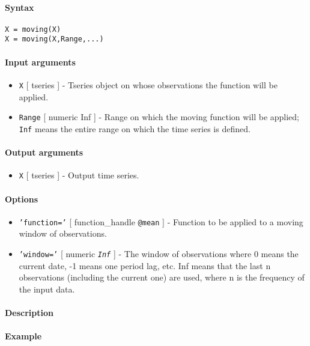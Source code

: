 


	\paragraph{Syntax}

\begin{verbatim}
X = moving(X)
X = moving(X,Range,...)
\end{verbatim}

\paragraph{Input arguments}

\begin{itemize}
\item
  \texttt{X} {[} tseries {]} - Tseries object on whose observations the
  function will be applied.
\item
  \texttt{Range} {[} numeric \textbar{} Inf {]} - Range on which the
  moving function will be applied; \texttt{Inf} means the entire range
  on which the time series is defined.
\end{itemize}

\paragraph{Output arguments}

\begin{itemize}
\itemsep1pt\parskip0pt
\item
  \texttt{X} {[} tseries {]} - Output time series.
\end{itemize}

\paragraph{Options}

\begin{itemize}
\item
  \texttt{'function='} {[} function\_handle \textbar{} \texttt{@mean}
  {]} - Function to be applied to a moving window of observations.
\item
  \texttt{'window='} {[} numeric \textbar{} \emph{\texttt{Inf}} {]} -
  The window of observations where 0 means the current date, -1 means
  one period lag, etc. Inf means that the last n observations (including
  the current one) are used, where n is the frequency of the input data.
\end{itemize}

\paragraph{Description}

\paragraph{Example}


